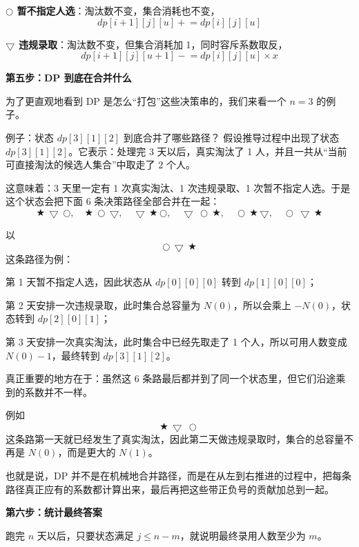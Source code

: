 \documentclass{book}
\newcommand{\FreeTake}{\ensuremath{\bigcirc}}
\newcommand{\BadTake}{\ensuremath{\bigtriangledown}}
\newcommand{\DropTake}{\ensuremath{\bigstar}}
\begin{document}
\quad \textbf{$\FreeTake$ 暂不指定人选}：淘汰数不变，集合消耗也不变，
\[
dp[i+1][j][u] \mathrel{+}= dp[i][j][u]
\]

\quad \textbf{$\BadTake$ 违规录取}：淘汰数不变，但集合消耗加 1，同时容斥系数取反，
\[
dp[i+1][j][u+1] \mathrel{-}= dp[i][j][u] \times x
\]

\par\medskip
\noindent\textbf{第五步：DP 到底在合并什么}
\par\medskip

为了更直观地看到 DP 是怎么“打包”这些决策串的，我们来看一个 $n=3$ 的例子。

\begin{examplebox}{例子：状态 $dp[3][1][2]$ 到底合并了哪些路径？}
假设推导过程中出现了状态 $dp[3][1][2]$。它表示：处理完 3 天以后，真实淘汰了 1 人，并且一共从“当前可直接淘汰的候选人集合”中取走了 2 个人。

这意味着：3 天里一定有 1 次真实淘汰、1 次违规录取、1 次暂不指定人选。于是这个状态会把下面 6 条决策路径全部合并在一起：
\[
\DropTake\,\BadTake\,\FreeTake,\quad
\DropTake\,\FreeTake\,\BadTake,\quad
\BadTake\,\DropTake\,\FreeTake,\quad
\BadTake\,\FreeTake\,\DropTake,\quad
\FreeTake\,\DropTake\,\BadTake,\quad
\FreeTake\,\BadTake\,\DropTake
\]

以
\[
\FreeTake\,\BadTake\,\DropTake
\]
这条路径为例：

\quad 第 1 天暂不指定人选，因此状态从 $dp[0][0][0]$ 转到 $dp[1][0][0]$；

\quad 第 2 天安排一次违规录取，此时集合总容量为 $N(0)$，所以会乘上 $-N(0)$，状态转到 $dp[2][0][1]$；

\quad 第 3 天安排一次真实淘汰，此时集合中已经先取走了 1 个人，所以可用人数变成 $N(0)-1$，最终转到 $dp[3][1][2]$。

真正重要的地方在于：虽然这 6 条路最后都并到了同一个状态里，但它们沿途乘到的系数并不一样。

例如
\[
\DropTake\,\BadTake\,\FreeTake
\]
这条路第一天就已经发生了真实淘汰，因此第二天做违规录取时，集合的总容量不再是 $N(0)$，而是更大的 $N(1)$。

也就是说，DP 并不是在机械地合并路径，而是在从左到右推进的过程中，把每条路径真正应有的系数都计算出来，最后再把这些带正负号的贡献加总到一起。
\end{examplebox}

\newpage
\par\medskip
\noindent\textbf{第六步：统计最终答案}
\par\medskip

跑完 $n$ 天以后，只要状态满足 $j \le n-m$，就说明最终录用人数至少为 $m$。
\end{document}
